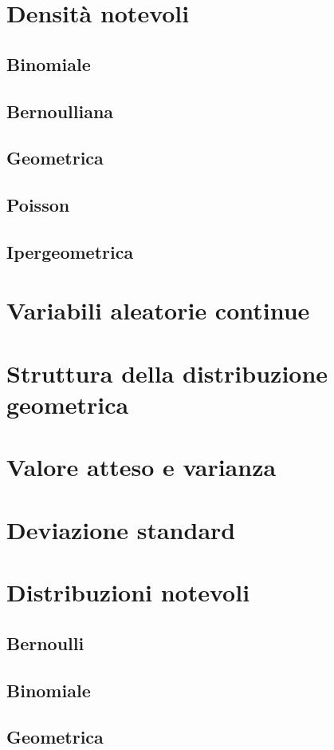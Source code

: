     \section{Densità notevoli}
        \subsection{Binomiale}

        \subsection{Bernoulliana}
        \subsection{Geometrica}
        \subsection{Poisson}
        \subsection{Ipergeometrica}
    \section{Variabili aleatorie continue}
    \section{Struttura della distribuzione geometrica}
    \section{Valore atteso e varianza}
    \section{Deviazione standard}
    \section{Distribuzioni notevoli}
        \subsection{Bernoulli}
        \subsection{Binomiale}
        \subsection{Geometrica}
